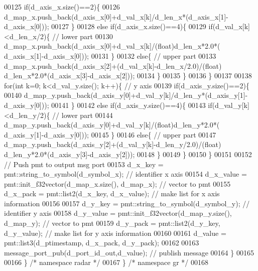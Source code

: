 \begin{DoxyCode}
00125             \textcolor{keywordflow}{if}(d_axis_x.size()==2)\{
00126                 d_map_x.push\_back(d_axis_x[0]+d_val_x[k]/d_len_x*(d_axis_x[1]-
      d_axis_x[0]));
00127             \}
00128             \textcolor{keywordflow}{else} \textcolor{keywordflow}{if}(d_axis_x.size()==4)\{
00129                 \textcolor{keywordflow}{if}(d_val_x[k]<d_len_x/2)\{ \textcolor{comment}{// lower part}
00130                     d_map_x.push\_back(d_axis_x[0]+d_val_x[k]/(\textcolor{keywordtype}{float})d_len_x*2.0*(
      d_axis_x[1]-d_axis_x[0]));
00131                 \}
00132                 \textcolor{keywordflow}{else}\{ \textcolor{comment}{// upper part}
00133                     d_map_x.push\_back(d_axis_x[2]+(d_val_x[k]-d_len_x/2.0)/(\textcolor{keywordtype}{float})
      d_len_x*2.0*(d_axis_x[3]-d_axis_x[2]));
00134                 \}
00135             \}
00136         \}
00137         
00138         \textcolor{keywordflow}{for}(\textcolor{keywordtype}{int} k=0; k<d_val_y.size(); k++)\{ \textcolor{comment}{// y axis}
00139             \textcolor{keywordflow}{if}(d_axis_y.size()==2)\{
00140                 d_map_y.push\_back(d_axis_y[0]+d_val_y[k]/d_len_y*(d_axis_y[1]-
      d_axis_y[0]));
00141             \}
00142             \textcolor{keywordflow}{else} \textcolor{keywordflow}{if}(d_axis_y.size()==4)\{
00143                 \textcolor{keywordflow}{if}(d_val_y[k]<d_len_y/2)\{ \textcolor{comment}{// lower part}
00144                     d_map_y.push\_back(d_axis_y[0]+d_val_y[k]/(\textcolor{keywordtype}{float})d_len_y*2.0*(
      d_axis_y[1]-d_axis_y[0]));
00145                 \}
00146                 \textcolor{keywordflow}{else}\{ \textcolor{comment}{// upper part}
00147                     d_map_y.push\_back(d_axis_y[2]+(d_val_y[k]-d_len_y/2.0)/(\textcolor{keywordtype}{float})
      d_len_y*2.0*(d_axis_y[3]-d_axis_y[2]));
00148                 \}
00149             \}
00150         \}
00151         
00152         \textcolor{comment}{// Push pmt to output msg port}
00153         d_x_key = pmt::string\_to\_symbol(d_symbol_x); \textcolor{comment}{// identifier x axis}
00154         d_x_value = pmt::init\_f32vector(d_map_x.size(), d_map_x); \textcolor{comment}{// vector to pmt}
00155         d_x_pack = pmt::list2(d_x_key, d_x_value); \textcolor{comment}{// make list for x axis information}
00156         
00157         d_y_key = pmt::string\_to\_symbol(d_symbol_y); \textcolor{comment}{// identifier y axis}
00158         d_y_value = pmt::init\_f32vector(d_map_y.size(), d_map_y); \textcolor{comment}{// vector to pmt}
00159         d_y_pack = pmt::list2(d_y_key, d_y_value); \textcolor{comment}{// make list for y axis information}
00160         
00161         d_value = pmt::list3(d_ptimestamp, d\_x\_pack, d\_y\_pack);
00162         
00163         message\_port\_pub(d_port_id_out,d_value); \textcolor{comment}{// publish message}
00164     \}
00165 
00166   \} \textcolor{comment}{/* namespace radar */}
00167 \} \textcolor{comment}{/* namespace gr */}
00168 
\end{DoxyCode}
